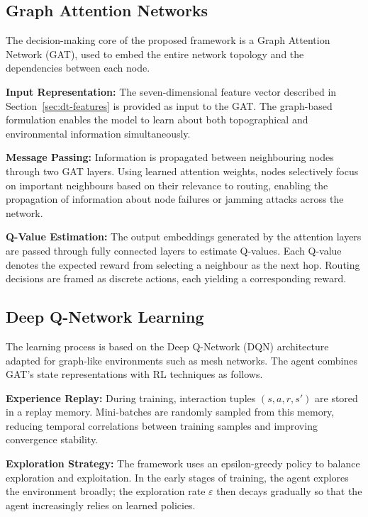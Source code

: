 \documentclass[conference]{IEEEtran}
\begin{document}
\subsection{Graph Attention Networks}

The decision-making core of the proposed framework is a Graph Attention Network (GAT), used to embed the entire network topology and the dependencies between each node.

\textbf{Input Representation:}
The seven-dimensional feature vector described in Section~\ref{sec:dt-features} is provided as input to the GAT. The graph-based formulation enables the model to learn about both topographical and environmental information simultaneously.

\textbf{Message Passing:}
Information is propagated between neighbouring nodes through two GAT layers. Using learned attention weights, nodes selectively focus on important neighbours based on their relevance to routing, enabling the propagation of information about node failures or jamming attacks across the network.

\textbf{Q-Value Estimation:}
The output embeddings generated by the attention layers are passed through fully connected layers to estimate Q-values. Each Q-value denotes the expected reward from selecting a neighbour as the next hop. Routing decisions are framed as discrete actions, each yielding a corresponding reward.

\subsection{Deep Q-Network Learning}

The learning process is based on the Deep Q-Network (DQN) architecture adapted for graph-like environments such as mesh networks. The agent combines GAT's state representations with RL techniques as follows.

\textbf{Experience Replay:}
During training, interaction tuples $(s, a, r, s')$ are stored in a replay memory. Mini-batches are randomly sampled from this memory, reducing temporal correlations between training samples and improving convergence stability.

\textbf{Exploration Strategy:}
The framework uses an epsilon-greedy policy to balance exploration and exploitation. In the early stages of training, the agent explores the environment broadly; the exploration rate $\varepsilon$ then decays gradually so that the agent increasingly relies on learned policies.
\end{document}
